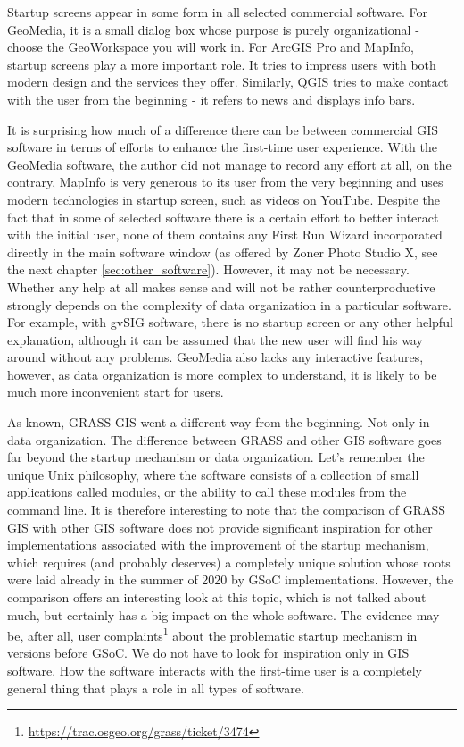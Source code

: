 \documentclass[a4paper,10pt,twoside]{article}
\begin{document}
\newpage \noindent Startup screens appear in some form in all selected commercial software. For GeoMedia, it is a small dialog box whose purpose is purely organizational - choose the GeoWorkspace you will work in. For ArcGIS Pro and MapInfo, startup screens play a more important role. It tries to impress users with both modern design and the services they offer. Similarly, QGIS tries to make contact with the user from the beginning - it refers to news and displays info bars.

It is surprising how much of a difference there can be between commercial GIS software in terms of efforts to enhance the first-time user experience. With the GeoMedia software, the author did not manage to record any effort at all, on the contrary, MapInfo is very generous to its user from the very beginning and uses modern technologies in startup screen, such as videos on YouTube. Despite the fact that in some of selected software there is a certain effort to better interact with the initial user, none of them contains any First Run Wizard incorporated directly in the main software window (as offered by Zoner Photo Studio X, see the next chapter \ref{sec:other_software}). However, it may not be necessary. Whether any help at all makes sense and will not be rather counterproductive strongly depends on the complexity of data organization in a particular software. For example, with gvSIG software, there is no startup screen or any other helpful explanation, although it can be assumed that the new user will find his way around without any problems. GeoMedia also lacks any interactive features, however, as data organization is more complex to understand, it is likely to be much more inconvenient start for users.

As known, GRASS GIS went a different way from the beginning. Not only in data organization. The difference between GRASS and other GIS software goes far beyond the startup mechanism or data organization. Let's remember the unique Unix philosophy, where the software consists of a collection of small applications called modules, or the ability to call these modules from the command line. It is therefore interesting to note that the comparison of GRASS GIS with other GIS software does not provide significant inspiration for other implementations associated with the improvement of the startup mechanism, which requires (and probably deserves) a completely unique solution whose roots were laid already in the summer of 2020 by GSoC implementations. However, the comparison offers an interesting look at this topic, which is not talked about much, but certainly has a big impact on the whole software. The evidence may be, after all,  user complaints\footnote{\url{https://trac.osgeo.org/grass/ticket/3474}} about the problematic startup mechanism in versions before GSoC.
We do not have to look for inspiration only in GIS software. How the software interacts with the first-time user is a completely general thing that plays a role in all types of software.
\end{document}
